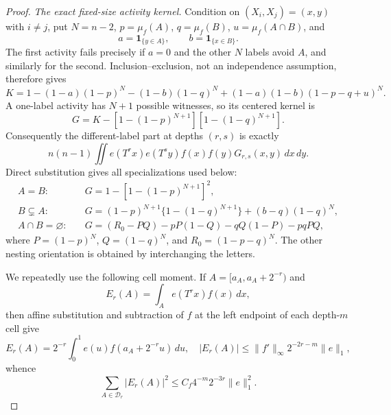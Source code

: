 \documentclass[11pt]{article}
\numberwithin{equation}{section}
\newcommand{\1}{\mathbf 1}\newcommand{\F}{\mathcal F}\newcommand{\D}{\mathcal D}
\newcommand{\norm}[1]{\lVert#1\rVert}
\begin{document}
\begin{proof}
\emph{The exact fixed-size activity kernel.}
Condition on $(X_i,X_j)=(x,y)$ with $i\ne j$, put $N=n-2$,
$p=\mu_f(A)$, $q=\mu_f(B)$, $u=\mu_f(A\cap B)$, and
\[
 a=\1_{\{y\in A\}},\qquad b=\1_{\{x\in B\}}.
\]
The first activity fails precisely if $a=0$ and the other $N$ labels avoid
$A$, and similarly for the second.  Inclusion--exclusion, not an independence
assumption, therefore gives
\begin{equation}\label{eq:tail-K}
 K=1-(1-a)(1-p)^N-(1-b)(1-q)^N
 +(1-a)(1-b)(1-p-q+u)^N.
\end{equation}
A one-label activity has $N+1$ possible witnesses, so its centered kernel is
\begin{equation}\label{eq:tail-G}
 G=K-[1-(1-p)^{N+1}][1-(1-q)^{N+1}].
\end{equation}
Consequently the different-label part at depths $(r,s)$ is exactly
\begin{equation}\label{eq:tail-two-label}
 n(n-1)\iint e(T^rx)e(T^sy)f(x)f(y)G_{r,s}(x,y)\,dx\,dy.
\end{equation}
Direct substitution gives all specializations used below:
\begin{align}
 A=B:\quad&G=1-[1-(1-p)^{N+1}]^2,                         \label{eq:Gsame}\\
 B\subsetneq A:\quad&G=(1-p)^{N+1}\{1-(1-q)^{N+1}\}
                    +(b-q)(1-q)^N,                       \label{eq:Gnest}\\
 A\cap B=\varnothing:\quad&G=(R_0-PQ)-pP(1-Q)-qQ(1-P)-pqPQ, \label{eq:Gdis}
\end{align}
where $P=(1-p)^N$, $Q=(1-q)^N$, and $R_0=(1-p-q)^N$.
The other nesting orientation is obtained by interchanging the letters.

We repeatedly use the following cell moment.  If
$A=[a_A,a_A+2^{-r})$ and
\[
 E_r(A)=\int_Ae(T^rx)f(x)\,dx,
\]
then affine substitution and subtraction of $f$ at the left endpoint of
each depth-$m$ cell give
\begin{equation}\label{eq:tail-cellmoment}
 E_r(A)=2^{-r}\int_0^1e(u)f(a_A+2^{-r}u)\,du,\quad
 |E_r(A)|\le \norm{f'}_\infty2^{-2r-m}\norm e_1,
\end{equation}
whence
\begin{equation}\label{eq:tail-cellenergy}
 \sum_{A\in\D_r}|E_r(A)|^2
 \le C_f4^{-m}2^{-3r}\norm e_1^2.
\end{equation}


\end{proof}
\end{document}
